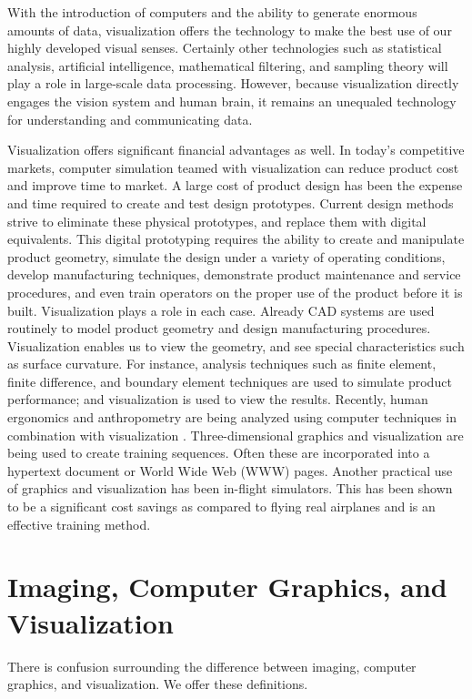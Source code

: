 With the introduction of computers and the ability to generate enormous amounts of data, visualization offers the technology to make the best use of our highly developed visual senses. Certainly other technologies such as statistical analysis, artificial intelligence, mathematical filtering, and sampling theory will play a role in large-scale data processing. However, because visualization directly engages the vision system and human brain, it remains an unequaled technology for understanding and communicating data.

Visualization offers significant financial advantages as well. In today's competitive markets, computer simulation teamed with visualization can reduce product cost and improve time to market. A large cost of product design has been the expense and time required to create and test design prototypes. Current design methods strive to eliminate these physical prototypes, and replace them with digital equivalents. This digital prototyping requires the ability to create and manipulate product geometry, simulate the design under a variety of operating conditions, develop manufacturing techniques, demonstrate product maintenance and service procedures, and even train operators on the proper use of the product before it is built. Visualization plays a role in each case. Already CAD systems are used routinely to model product geometry and design manufacturing procedures. Visualization enables us to view the geometry, and see special characteristics such as surface curvature. For instance, analysis techniques such as finite element, finite difference, and boundary element techniques are used to simulate product performance; and visualization is used to view the results. Recently, human ergonomics and anthropometry are being analyzed using computer techniques in combination with visualization \cite{MDHMS}. Three-dimensional graphics and visualization are being used to create training sequences. Often these are incorporated into a hypertext document or World Wide Web (WWW) pages. Another practical use of graphics and visualization has been in-flight simulators. This has been shown to be a significant cost savings as compared to flying real airplanes and is an effective training method.

\section{Imaging, Computer Graphics, and Visualization}

There is confusion surrounding the difference between imaging, computer graphics, and visualization. We offer these definitions.

